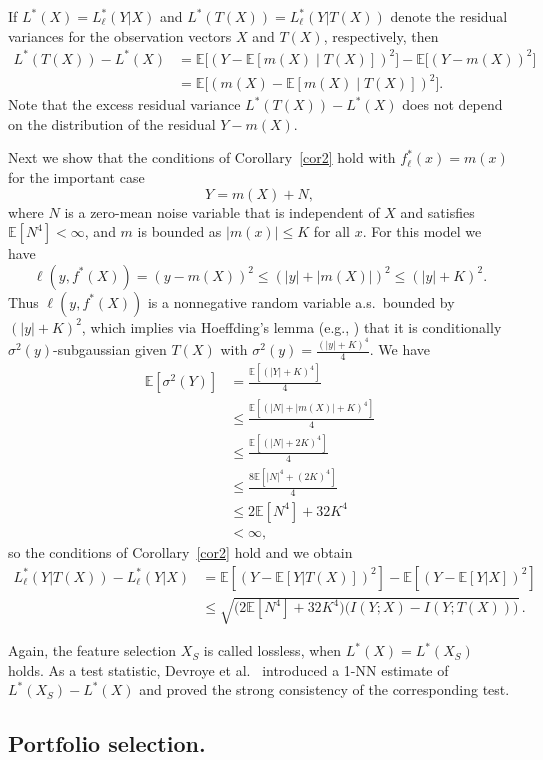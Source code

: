 \documentclass[11pt]{article}
\def\EXP {{\mathbb E}}
\begin{document}
If $L^*(X)=L^*_\ell(Y|X)$ and $L^*(T(X))=L_\ell^*(Y|T(X))$ denote the residual variances for the observation vectors $X$ and $T(X)$, respectively, then 
\begin{align*}
L^*(T(X))-L^*(X)
&=\EXP\big[ (Y-\EXP[m(X)\mid T(X)] )^2\big] -\EXP\big[ (Y-m(X))^2\big] \\
&=\EXP\big[ (m(X)-\EXP[m(X)\mid T(X)])^2\big].
\end{align*}
Note that the excess residual variance $L^*(T(X))-L^*(X)$ does not depend on the distribution of the residual $Y-m(X)$.



Next we show that the conditions of Corollary~\ref{cor2} hold with $f^*_\ell(x)=m(x)$ for the important  case 
\[Y=m(X)+N,
\]
where $N$ is a zero-mean noise variable that is independent of $X$ and satisfies $\EXP[N^4]<\infty$, and  $m$ is bounded as   $|m(x)|\le K$ for all $x$. For this model  we have 
\[
\ell(y,f^*(X))
= (y-m(X))^2 
\le (|y|+|m(X)|)^2 
\le (|y|+K)^2. 
\]
Thus $\ell(y,f^*(X))$ is a nonnegative random variable a.s.\ bounded by $(|y|+K)^2$, which implies via  Hoeffding's lemma (e.g.,  \cite[Lemma~2.2]{BuLuMa13})  that it is conditionally 
$\sigma^2(y)$-subgaussian given $T(X)$ with $\sigma^2(y)= \frac{(|y|+K)^4}{4}$. We have 
\begin{align*}
\EXP[\sigma^2(Y)] 
&= \frac{\EXP\left[(|Y|+K)^4\right]}{4} \\ 
&\le \frac{\EXP\left[(|N|+|m(X)|+K)^4\right]}{4}\\
&\le \frac{\EXP\left[(|N|+2K)^4\right]}{4}\\
&\le \frac{8\EXP\left[|N|^4+(2K)^4\right]}{4}\\
&\le 2\EXP[N^4] +32K^4\\
&<\infty, 
\end{align*}
so the conditions of  Corollary~\ref{cor2} hold and we obtain 
\begin{align*}
L_\ell^*(Y|T(X))- L_\ell^*(Y|X)  
&= 
\EXP[(Y-\EXP[Y|T(X)])^2] - \EXP[(Y-\EXP[Y|X])^2] \\
& \le \sqrt{ \big(2\EXP[N^4] +32K^4\big)  \big( I(Y;X)-I(Y;T(X)) \big) }\, .
\end{align*}

Again, the feature selection $X_S$ is called lossless, when $L^*(X)=L^*(X_S)$ holds.
As a test statistic,
Devroye et al.\ \cite{DeGyLuWa18} introduced a 1-NN  estimate of $L^*(X_S)-L^*(X)$
and proved the strong consistency of the corresponding test.



\subsection{Portfolio selection.}
\label{sec-portf}
\end{document}
